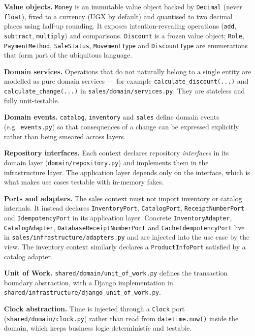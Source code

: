 \documentclass[11pt,a4paper]{article}
\begin{document}
\textbf{Value objects.} \texttt{Money} is an immutable value object backed by \texttt{Decimal} (never
\texttt{float}), fixed to a currency (UGX by default) and quantised to two decimal places using
half-up rounding. It exposes intention-revealing operations (\texttt{add}, \texttt{subtract},
\texttt{multiply}) and comparisons. \texttt{Discount} is a frozen value object; \texttt{Role},
\texttt{PaymentMethod}, \texttt{SaleStatus}, \texttt{MovementType} and \texttt{DiscountType} are
enumerations that form part of the ubiquitous language.

\textbf{Domain services.} Operations that do not naturally belong to a single entity are modelled as
pure domain services --- for example \texttt{calculate\_discount(...)} and
\texttt{calculate\_change(...)} in \texttt{sales/domain/services.py}. They are stateless and fully
unit-testable.

\textbf{Domain events.} \texttt{catalog}, \texttt{inventory} and \texttt{sales} define domain events
(e.g.\ \texttt{events.py}) so that consequences of a change can be expressed explicitly rather than
being smeared across layers.

\textbf{Repository interfaces.} Each context declares repository \emph{interfaces} in its domain
layer (\texttt{domain/repository.py}) and implements them in the infrastructure layer. The application
layer depends only on the interface, which is what makes use cases testable with in-memory fakes.

\textbf{Ports and adapters.} The sales context must not import inventory or catalog internals. It
instead declares \texttt{InventoryPort}, \texttt{CatalogPort}, \texttt{ReceiptNumberPort} and
\texttt{IdempotencyPort} in its application layer. Concrete \texttt{InventoryAdapter},
\texttt{CatalogAdapter}, \texttt{DatabaseReceiptNumberPort} and \texttt{CacheIdempotencyPort} live in
\texttt{sales/infrastructure/adapters.py} and are injected into the use case by the view. The
inventory context similarly declares a \texttt{ProductInfoPort} satisfied by a catalog adapter.

\textbf{Unit of Work.} \texttt{shared/domain/unit\_of\_work.py} defines the transaction boundary
abstraction, with a Django implementation in \texttt{shared/infrastructure/django\_unit\_of\_work.py}.

\textbf{Clock abstraction.} Time is injected through a \texttt{Clock} port
(\texttt{shared/domain/clock.py}) rather than read from \texttt{datetime.now()} inside the domain,
which keeps business logic deterministic and testable.
\end{document}
